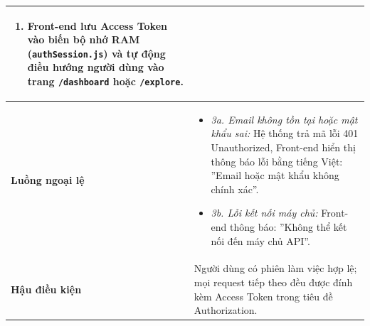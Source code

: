 \begin{table}[htbp]
\begin{tabularx}{\textwidth}{|l|X|}
\begin{enumerate}[leftmargin=*, nosep]
    \item Front-end lưu Access Token vào biến bộ nhớ RAM (\texttt{authSession.js}) và tự động điều hướng người dùng vào trang \texttt{/dashboard} hoặc \texttt{/explore}.
\end{enumerate} \\ \hline
\textbf{Luồng ngoại lệ} & 
\begin{itemize}[leftmargin=*, nosep]
    \item \textit{3a. Email không tồn tại hoặc mật khẩu sai:} Hệ thống trả mã lỗi 401 Unauthorized, Front-end hiển thị thông báo lỗi bằng tiếng Việt: ''Email hoặc mật khẩu không chính xác''.
    \item \textit{3b. Lỗi kết nối máy chủ:} Front-end thông báo: ''Không thể kết nối đến máy chủ API''.
\end{itemize} \\ \hline
\textbf{Hậu điều kiện} & Người dùng có phiên làm việc hợp lệ; mọi request tiếp theo đều được đính kèm Access Token trong tiêu đề Authorization. \\ \hline
\end{tabularx}
\end{table}

